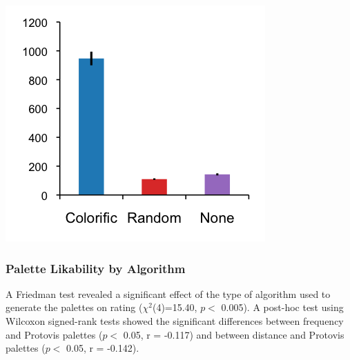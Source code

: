 \begin{center}
\includegraphics{relevance_chart.png}
\end{center}

\subsubsection{Palette Likability by Algorithm} 
A Friedman test revealed a significant effect of the type of algorithm used to generate the palettes on rating ($\chi^2$(4)=15.40, $p <$ 0.005). A post-hoc test using Wilcoxon signed-rank tests showed the significant differences between frequency and Protovis palettes ($p <$ 0.05, r = -0.117) and between distance and Protovis palettes ($p <$ 0.05, r = -0.142).

